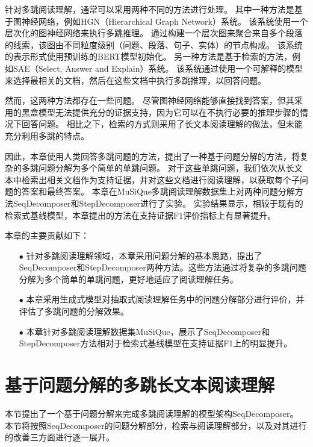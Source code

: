 

针对多跳阅读理解，通常可以采用两种不同的方法进行处理。
其中一种方法是基于图神经网络，例如HGN\cite{Fang2019HierarchicalGN}（Hierarchical Graph Network）系统。
该系统使用一个层次化的图神经网络来执行多跳推理。
通过构建一个层次图来聚合来自多个段落的线索，该图由不同粒度级别（问题、段落、句子、实体）的节点构成。
该系统的表示形式使用预训练的BERT模型初始化。
另一种方法是基于检索的方法，例如SAE\cite{Tu2019SelectAA}（Select, Answer and Explain）系统。
该系统通过使用一个可解释的模型来选择最相关的文档，然后在这些文档中执行多跳推理，以回答问题。

然而，这两种方法都存在一些问题。
尽管图神经网络能够直接找到答案，但其采用的黑盒模型无法提供充分的证据支持，因为它可以在不执行必要的推理步骤的情况下回答问题。
相比之下，检索的方式则采用了长文本阅读理解的做法，但未能充分利用多跳的特点。

因此，本章使用人类回答多跳问题的方法，提出了一种基于问题分解的方法，将复杂的多跳问题分解为多个简单的单跳问题。
对于这些单跳问题，我们依次从长文本中检索出相关文档作为支持证据，并对这些文档进行阅读理解，以获取每个子问题的答案和最终答案。
本章在MuSiQue多跳阅读理解数据集上对两种问题分解方法SeqDecomposer和StepDecomposer进行了实验。
实验结果显示，相较于现有的检索式基线模型，本章提出的方法在支持证据F1评价指标上有显著提升。

本章的主要贡献如下：
\begin{itemize}
    \item[$\bullet$] 针对多跳阅读理解领域，本章采用问题分解的基本思路，提出了SeqDecomposer和StepDecomposer两种方法。这些方法通过将复杂的多跳问题分解为多个简单的单跳问题，更好地适应了阅读理解任务。
    \item[$\bullet$] 本章采用生成式模型对抽取式阅读理解任务中的问题分解部分进行评价，并评估了多跳问题的分解效果。
    \item[$\bullet$] 本章针对多跳阅读理解数据集MuSiQue，展示了SeqDecomposer和StepDecomposer方法相对于检索式基线模型在支持证据F1上的明显提升。
\end{itemize}


\section{基于问题分解的多跳长文本阅读理解}
本节提出了一个基于问题分解来完成多跳阅读理解的模型架构SeqDecomposer。
本节将按照SeqDecomposer的问题分解部分，检索与阅读理解部分，以及对其进行的改善三方面进行逐一展开。

